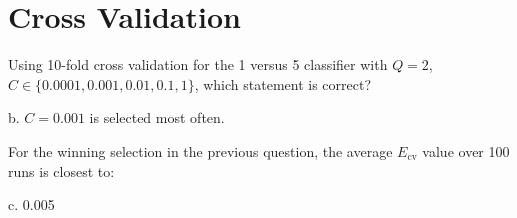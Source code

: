 \documentclass[answers]{exam}
\begin{document}
\section*{Cross Validation}

\begin{questions}
\setcounter{question}{6}
\question Using 10-fold cross validation for the 1 versus 5 classifier with 
\(Q = 2\), \(C \in \{0.0001, 0.001, 0.01, 0.1, 1\}\), which statement is correct?

\begin{solution}
b. \(C = 0.001\) is selected most often.
\end{solution}

\question For the winning selection in the previous question, the average 
\(E_{\text{cv}}\) value over 100 runs is closest to:

\begin{solution}
c. 0.005
\end{solution}
\end{questions}
\end{document}
